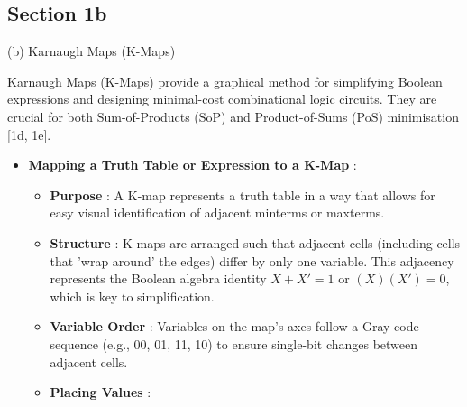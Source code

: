 \documentclass{article}
\begin{document}
\begin{itemize}
\section{Section 1b}

(b) Karnaugh Maps (K-Maps)

Karnaugh Maps (K-Maps) provide a graphical method for simplifying Boolean expressions and designing minimal-cost combinational logic circuits. They are crucial for both Sum-of-Products (SoP) and Product-of-Sums (PoS) minimisation [1d, 1e].

\begin{itemize}
    \item \textbf{Mapping a Truth Table or Expression to a K-Map} :
    \begin{itemize}
        \item \textbf{Purpose} : A K-map represents a truth table in a way that allows for easy visual identification of adjacent minterms or maxterms.
        \item \textbf{Structure} : K-maps are arranged such that adjacent cells (including cells that 'wrap around' the edges) differ by only one variable. This adjacency represents the Boolean algebra identity $X + X' = 1$ or $(X)(X') = 0$, which is key to simplification.
        \item \textbf{Variable Order} : Variables on the map's axes follow a Gray code sequence (e.g., 00, 01, 11, 10) to ensure single-bit changes between adjacent cells.
        \item \textbf{Placing Values} :
    \end{itemize}

\end{itemize}
\end{itemize}
\end{document}
